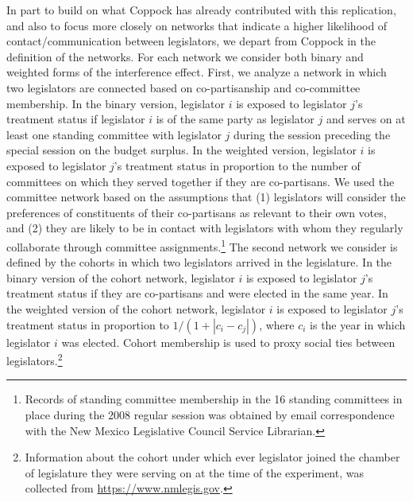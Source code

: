 \documentclass[12pt]{article}
\begin{document}
In part to build on what Coppock has already contributed with this replication, and also to focus more closely on networks that indicate a higher likelihood of contact/communication between legislators, we depart from Coppock in the definition of the networks. For each network we consider both binary and weighted forms of the interference effect. First, we analyze a network in which two legislators are connected based on co-partisanship and co-committee membership. In the binary version, legislator $i$ is exposed to legislator $j$'s treatment status if legislator $i$ is of the same party as legislator $j$ and serves on at least one standing committee with legislator $j$ during the session preceding the special session on the budget surplus. In the weighted version, legislator $i$ is exposed to legislator $j$'s treatment status in proportion to the number of committees on which they served together if they are co-partisans. We used the committee network based on the assumptions that (1) legislators will consider the preferences of constituents of their co-partisans as relevant to their own votes, and (2) they are likely to be in contact with legislators with whom they regularly collaborate through committee assignments.\footnote{Records of standing committee membership in the 16 standing committees in place during the 2008 regular session was obtained by email correspondence with the New Mexico Legislative Council Service Librarian.}  The second network we consider is defined by the cohorts in which two legislators arrived in the legislature. In the binary version of the cohort network, legislator $i$ is exposed to legislator $j$'s treatment status if they are co-partisans and were elected in the same year. In the weighted version of the cohort network, legislator $i$ is exposed to legislator $j$'s treatment status in proportion to $1/(1+|c_i-c_j|)$, where $c_i$ is the year in which legislator $i$ was elected. Cohort membership is used to proxy social ties between legislators.\footnote{Information about the cohort under which ever legislator joined the chamber of legislature they were serving on at the time of the experiment, was collected from \url{https://www.nmlegis.gov}.}
\end{document}
